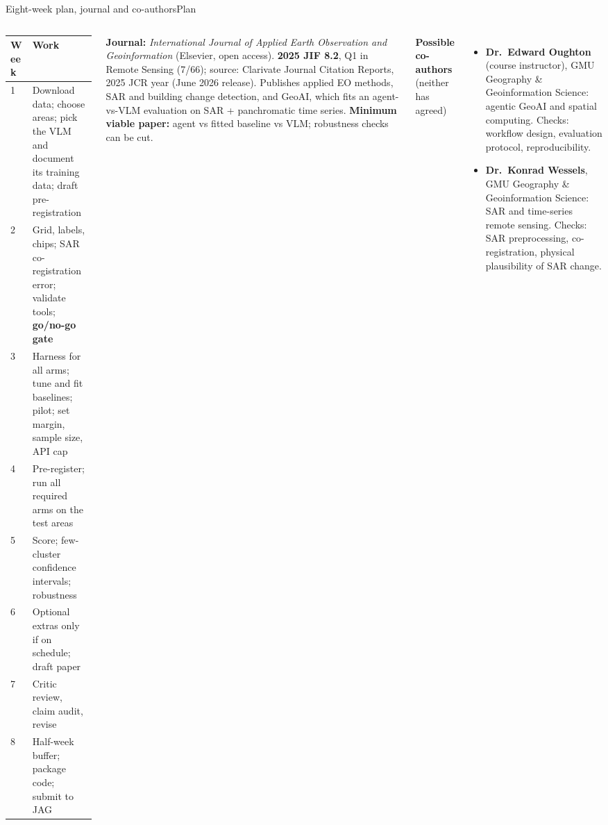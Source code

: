 \documentclass[aspectratio=169,11pt]{beamer}
\begin{document}
\begin{frame}[shrink=20]{Eight-week plan, journal and co-authors}{Plan}
\begin{columns}[T,onlytextwidth]
\scriptsize
\begin{tabular}{@{}lp{5.6cm}@{}}
\toprule
\textbf{Week} & \textbf{Work} \\
\midrule
1 & Download data; choose areas; pick the VLM and document its training data; draft pre-registration \\
2 & Grid, labels, chips; SAR co-registration error; validate tools; \textbf{go/no-go gate} \\
3 & Harness for all arms; tune and fit baselines; pilot; set margin, sample size, API cap \\
4 & Pre-register; run all required arms on the test areas \\
5 & Score; few-cluster confidence intervals; robustness \\
6 & Optional extras only if on schedule; draft paper \\
7 & Critic review, claim audit, revise \\
8 & Half-week buffer; package code; submit to JAG \\
\bottomrule
\end{tabular}
{\footnotesize\textbf{Journal:} \emph{International Journal of Applied Earth Observation and Geoinformation} (Elsevier, open access). \textbf{2025 JIF 8.2}, Q1 in Remote Sensing (7/66); source: Clarivate Journal Citation Reports, 2025 JCR year (June 2026 release). Publishes applied EO methods, SAR and building change detection, and GeoAI, which fits an agent-vs-VLM evaluation on SAR + panchromatic time series.}
\vspace{6pt}
{\scriptsize\textbf{Minimum viable paper:} agent vs fitted baseline vs VLM; robustness checks can be cut.}\par\textbf{Possible co-authors} {\scriptsize(neither has agreed)}
\begin{itemize}\scriptsize
  \item \textbf{Dr.\ Edward Oughton} (course instructor), GMU Geography \& Geoinformation Science: agentic GeoAI and spatial computing. Checks: workflow design, evaluation protocol, reproducibility.
  \item \textbf{Dr.\ Konrad Wessels}, GMU Geography \& Geoinformation Science: SAR and time-series remote sensing. Checks: SAR preprocessing, co-registration, physical plausibility of SAR change.
\end{itemize}
\end{columns}
\end{frame}
\end{document}
